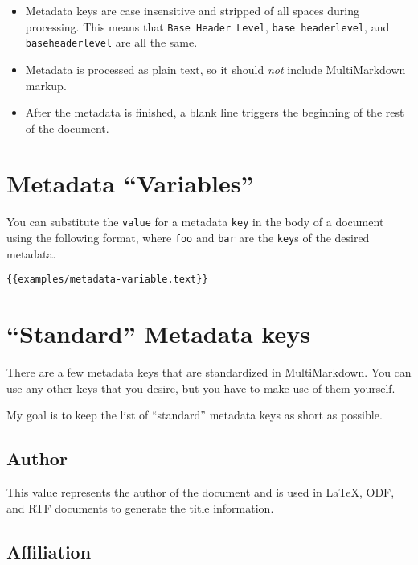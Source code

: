 \begin{itemize}
\item Metadata keys are case insensitive and stripped of all spaces during processing. This means that \texttt{Base Header Level}, \texttt{base headerlevel}, and \texttt{baseheaderlevel} are all the same.

\item Metadata is processed as plain text, so it should \emph{not} include MultiMarkdown markup.

\item After the metadata is finished, a blank line triggers the beginning of the rest of the document.

\end{itemize}

\section{Metadata ``Variables'' }
\label{metadatavariables}

You can substitute the \texttt{value} for a metadata \texttt{key} in the body of a document using the following format, where \texttt{foo} and \texttt{bar} are the \texttt{key}s of the desired metadata.

\begin{verbatim}
{{examples/metadata-variable.text}}
\end{verbatim}

\section{``Standard'' Metadata keys }
\label{standardmetadatakeys}

There are a few metadata keys that are standardized in MultiMarkdown. You can
use any other keys that you desire, but you have to make use of them yourself.

My goal is to keep the list of ``standard'' metadata keys as short as possible.

\subsection{Author }
\label{author}

This value represents the author of the document and is used in LaTeX, ODF, and RTF
documents to generate the title information.

\subsection{Affiliation }
\label{affiliation}

